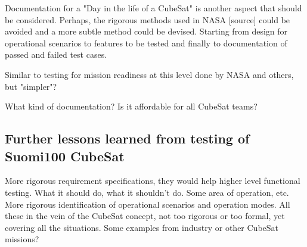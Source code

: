 \documentclass[english,12pt,a4paper,pdftex,elec,utf8]{aaltothesis}
\begin{document}
Documentation for a "Day in the life of a CubeSat" is another aspect that should be considered. Perhaps, the rigorous methods used in NASA [source] could be avoided and a more subtle method could be devised. Starting from design for operational scenarios to features to be tested and finally to documentation of passed and failed test cases.\par
  
Similar to testing for mission readiness at this level done by NASA and others, but "simpler"?\par 
What kind of documentation? Is it affordable for all CubeSat teams?\par
\subsection{Further lessons learned from testing of Suomi100 CubeSat}
More rigorous requirement specifications, they would help higher level functional testing.
What it should do, what it shouldn't do. Some area of operation, etc. More rigorous identification of operational scenarios and operation modes. All these in the vein of the CubeSat concept, not too rigorous or too formal, yet covering all the situations. Some examples from industry or other CubeSat missions?\par  




\clearpage
\end{document}
